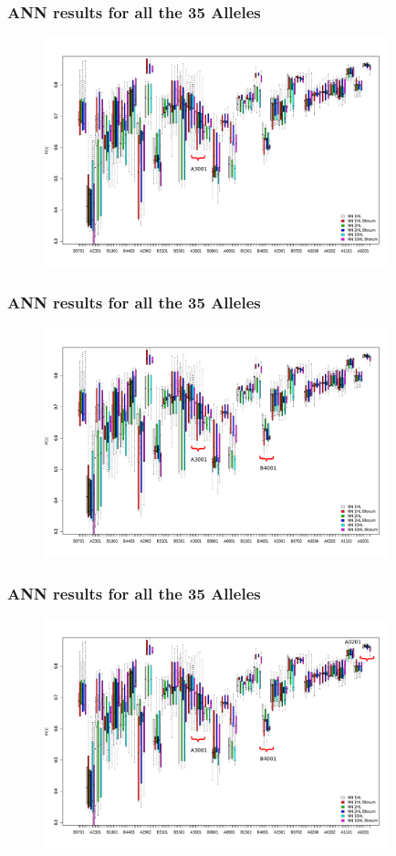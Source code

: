 \documentclass[presentation]{beamer}   %
\begin{document}
\begin{frame}
\frametitle{ANN results for all the 35 Alleles}
\begin{figure}[ht]
\begin{center}
\includegraphics[width=10cm]{fig/ann_tag1.pdf}
\end{center}
\end{figure}
\end{frame}

\begin{frame}
\frametitle{ANN results for all the 35 Alleles}
\begin{figure}[ht]
\begin{center}
\includegraphics[width=10cm]{fig/ann_tag2.pdf}
\end{center}
\end{figure}
\end{frame}

\begin{frame}
\frametitle{ANN results for all the 35 Alleles}
\begin{figure}[ht]
\begin{center}
\includegraphics[width=10cm]{fig/ann_tag3.pdf}
\end{center}
\end{figure}
\end{frame}
\end{document}
